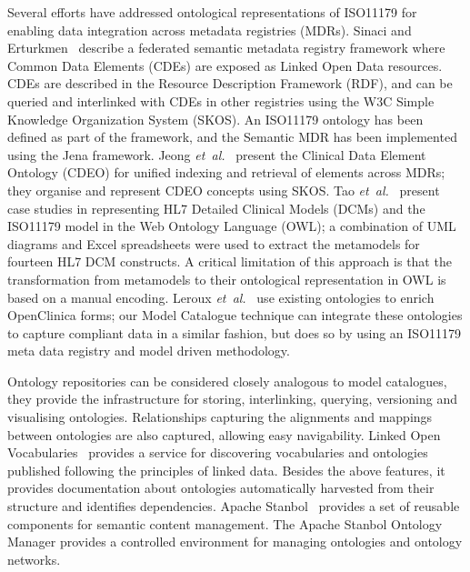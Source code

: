 Several efforts have addressed ontological representations of ISO11179 
for enabling data integration across metadata
registries (MDRs). Sinaci and Erturkmen~\cite{Sinaci2013784} describe a
federated semantic metadata registry framework where Common Data
Elements (CDEs) are exposed as Linked Open Data resources. CDEs are
described in the Resource Description Framework (RDF), and can be queried and interlinked with CDEs in other
registries using the W3C Simple Knowledge Organization System (SKOS). 
An ISO11179 ontology has been defined as part of
the framework, and the Semantic MDR has been implemented using the Jena
framework. 
Jeong \textit{et~al.}~\cite{pmid25405066} present the Clinical
Data Element Ontology (CDEO) for unified indexing and retrieval of
elements across MDRs; they organise and
represent CDEO concepts using SKOS. 
Tao \textit{et~al.}~\cite{pmid22211181} present
case studies in representing HL7 Detailed Clinical Models (DCMs) and
the ISO11179 model in the Web Ontology Language (OWL);
a combination of UML diagrams and Excel
spreadsheets were used to extract the metamodels for fourteen HL7 DCM
constructs. A critical limitation of this approach is that the
transformation from metamodels to their ontological representation in
OWL is based on a manual encoding. 
Leroux \textit{et~al.}~\cite{lero12} use existing
ontologies to enrich OpenClinica forms; our Model Catalogue
technique can integrate these ontologies to capture compliant data in
a similar fashion, but does so by using an ISO11179 meta data registry
and model driven methodology.


Ontology repositories can be considered closely analogous to model
catalogues, they provide the infrastructure for storing, interlinking,
querying, versioning and visualising ontologies. Relationships
capturing the alignments and mappings between ontologies are also
captured, allowing easy navigability. Linked Open
Vocabularies~\cite{LOV} provides a service for discovering
vocabularies and ontologies published following the principles of
linked data. Besides the above features, it provides documentation
about ontologies automatically harvested from their structure and
identifies dependencies. Apache Stanbol~\cite{Stanbol} provides a set
of reusable components for semantic content management. The Apache
Stanbol Ontology Manager provides a controlled environment for
managing ontologies and ontology networks. 


